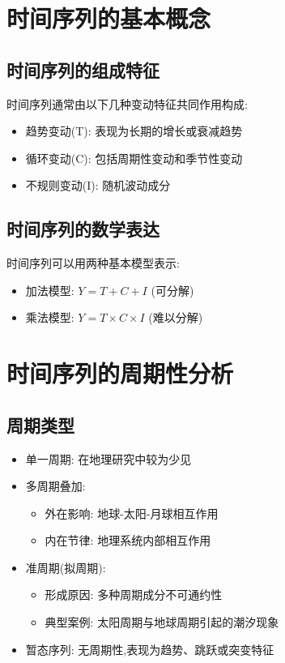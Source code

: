 \section{时间序列的基本概念}

\subsection{时间序列的组成特征}
时间序列通常由以下几种变动特征共同作用构成:
\begin{itemize}
    \item 趋势变动(T): 表现为长期的增长或衰减趋势
    \item 循环变动(C): 包括周期性变动和季节性变动
    \item 不规则变动(I): 随机波动成分
\end{itemize}

\subsection{时间序列的数学表达}
时间序列可以用两种基本模型表示:
\begin{itemize}
    \item 加法模型: $Y = T + C + I$ (可分解)
    \item 乘法模型: $Y = T \times C \times I$ (难以分解)
\end{itemize}

\section{时间序列的周期性分析}

\subsection{周期类型}
\begin{itemize}
    \item 单一周期: 在地理研究中较为少见
    \item 多周期叠加: 
        \begin{itemize}
            \item 外在影响: 地球-太阳-月球相互作用
            \item 内在节律: 地理系统内部相互作用
        \end{itemize}
    \item 准周期(拟周期): 
        \begin{itemize}
            \item 形成原因: 多种周期成分不可通约性
            \item 典型案例: 太阳周期与地球周期引起的潮汐现象
        \end{itemize}
    \item 暂态序列: 无周期性,表现为趋势、跳跃或突变特征
\end{itemize}

